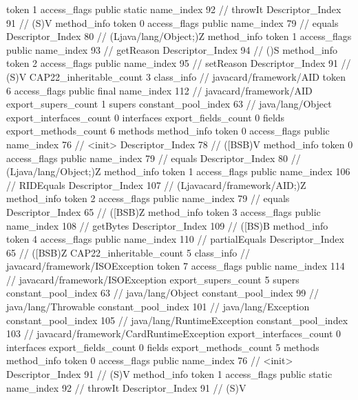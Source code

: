 {{{{{					token	1
					access_flags	public static
					name_index	92		// throwIt
					Descriptor_Index	91		// (S)V
				}
				method_info {
					token	0
					access_flags	public
					name_index	79		// equals
					Descriptor_Index	80		// (Ljava/lang/Object;)Z
				}
				method_info {
					token	1
					access_flags	public
					name_index	93		// getReason
					Descriptor_Index	94		// ()S
				}
				method_info {
					token	2
					access_flags	public
					name_index	95		// setReason
					Descriptor_Index	91		// (S)V
				}
			}
			CAP22_inheritable_count	3
		}
		class_info {		// javacard/framework/AID
			token	6
			access_flags	public final
			name_index	112		// javacard/framework/AID
			export_supers_count	1
			supers {
				constant_pool_index	63		// java/lang/Object
			}
			export_interfaces_count	0
			interfaces {
			}
			export_fields_count	0
			fields {
			}
			export_methods_count	6
			methods {
				method_info {
					token	0
					access_flags	public
					name_index	76		// <init>
					Descriptor_Index	78		// ([BSB)V
				}
				method_info {
					token	0
					access_flags	public
					name_index	79		// equals
					Descriptor_Index	80		// (Ljava/lang/Object;)Z
				}
				method_info {
					token	1
					access_flags	public
					name_index	106		// RIDEquals
					Descriptor_Index	107		// (Ljavacard/framework/AID;)Z
				}
				method_info {
					token	2
					access_flags	public
					name_index	79		// equals
					Descriptor_Index	65		// ([BSB)Z
				}
				method_info {
					token	3
					access_flags	public
					name_index	108		// getBytes
					Descriptor_Index	109		// ([BS)B
				}
				method_info {
					token	4
					access_flags	public
					name_index	110		// partialEquals
					Descriptor_Index	65		// ([BSB)Z
				}
			}
			CAP22_inheritable_count	5
		}
		class_info {		// javacard/framework/ISOException
			token	7
			access_flags	public
			name_index	114		// javacard/framework/ISOException
			export_supers_count	5
			supers {
				constant_pool_index	63		// java/lang/Object
				constant_pool_index	99		// java/lang/Throwable
				constant_pool_index	101		// java/lang/Exception
				constant_pool_index	105		// java/lang/RuntimeException
				constant_pool_index	103		// javacard/framework/CardRuntimeException
			}
			export_interfaces_count	0
			interfaces {
			}
			export_fields_count	0
			fields {
			}
			export_methods_count	5
			methods {
				method_info {
					token	0
					access_flags	public
					name_index	76		// <init>
					Descriptor_Index	91		// (S)V
				}
				method_info {
					token	1
					access_flags	public static
					name_index	92		// throwIt
					Descriptor_Index	91		// (S)V
}}}}}
